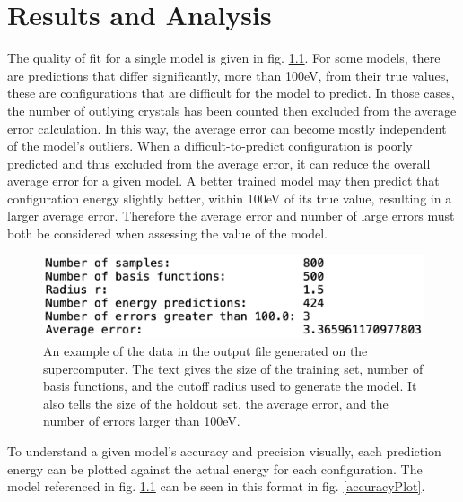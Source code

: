 \chapter{Results and Analysis}\label{Sect:results}
\par The quality of fit for a single model is given in fig. \ref{outputExample}. For some models, there are predictions that differ significantly, more than 100eV, from their true values, these are configurations that are difficult for the model to predict. In those cases, the number of outlying crystals has been counted then excluded from the average error calculation. In this way, the average error can become mostly independent of the model's outliers. When a difficult-to-predict configuration is poorly predicted and thus excluded from the average error, it can reduce the overall average error for a given model. A better trained model may then predict that configuration energy slightly better, within 100eV of its true value, resulting in a larger average error. Therefore the average error and number of large errors must both be considered when assessing the value of the model. 

\begin{figure}%
\centering
\includegraphics[scale = 0.6]{Figures/outputExample}
\caption{An example of the data in the output file generated on the supercomputer. The text gives the size of the training set, number of basis functions, and the cutoff radius used to generate the model. It also tells the size of the holdout set, the average error, and the number of errors larger than 100eV.
\label{outputExample}} 
\end{figure}

\par To understand a given model's accuracy and precision visually, each prediction energy can be plotted against the actual energy for each configuration. The model referenced in fig. \ref{outputExample} can be seen in this format in fig. \ref{accuracyPlot}.

